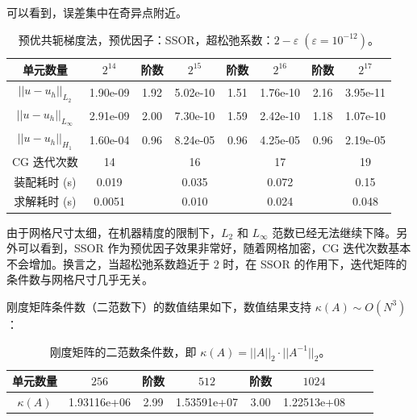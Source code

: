 \documentclass[lang=cn,11pt,a4paper]{elegantpaper}
\begin{document}
可以看到，误差集中在奇异点附近。

\begin{table}[H]
    \centering
    \begin{tabular}{|c|c|c|c|c|c|c|c|}
    \hline
    单元数量                    & $2^{14}$ & 阶数 & $2^{15}$ & 阶数 & $2^{16}$ & 阶数 & $2^{17}$ \\ \hline
    $||u-u_h||_{L_2}$      & 1.90e-09     & 1.92 & 5.02e-10     & 1.51 & 1.76e-10     & 2.16 & 3.95e-11     \\ \hline
    $||u-u_h||_{L_\infty}$ & 2.91e-09     & 2.00 & 7.30e-10     & 1.59 & 2.42e-10     & 1.18 & 1.07e-10     \\ \hline
    $||u-u_h||_{H_1}$      & 1.60e-04     & 0.96 & 8.24e-05     & 0.96 & 4.25e-05     & 0.96 & 2.19e-05     \\ \hline
    CG 迭代次数            & 14 & & 16 & & 17 & & 19\\    
\hline
    装配耗时 (s)           & 0.019         &      & 0.035          &      & 0.072           &      & 0.15     \\ \hline
    求解耗时 (s)           & 0.0051         &      & 0.010          &      & 0.024           &      & 0.048     \\ \hline
    \end{tabular}
    \caption{\small 预优共轭梯度法，预优因子：SSOR，超松弛系数：$2-\varepsilon\;(\varepsilon=10^{-12})$。}
\end{table}

由于网格尺寸太细，在机器精度的限制下，$L_2$ 和 $L_\infty$ 范数已经无法继续下降。另外可以看到，SSOR 作为预优因子效果非常好，随着网格加密，CG 迭代次数基本不会增加。换言之，当超松弛系数趋近于 $2$ 时，在 SSOR 的作用下，迭代矩阵的条件数与网格尺寸几乎无关。

刚度矩阵条件数（二范数下）的数值结果如下，数值结果支持 $\kappa(A)\sim O(N^3)$：

\begin{table}[H]
    \centering
    \begin{tabular}{|c|c|c|c|c|c|c|c|}
    \hline
    单元数量                    & $256$ & 阶数 & $512$ & 阶数 & $1024$ \\ \hline
  $\kappa(A)$            & 1.93116e+06 & 2.99 & 1.53591e+07 & 3.00 & 1.22513e+08\\    \hline
    \end{tabular}
    \caption{\small 刚度矩阵的二范数条件数，即 $\kappa(A)=||A||_2\cdot ||A^{-1}||_2$。}
\end{table}
\end{document}
